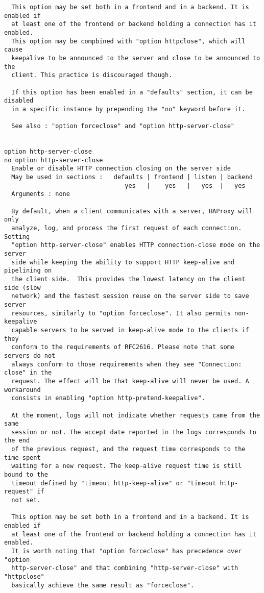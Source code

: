 \begin{verbatim}
  This option may be set both in a frontend and in a backend. It is enabled if
  at least one of the frontend or backend holding a connection has it enabled.
  This option may be compbined with "option httpclose", which will cause
  keepalive to be announced to the server and close to be announced to the
  client. This practice is discouraged though.

  If this option has been enabled in a "defaults" section, it can be disabled
  in a specific instance by prepending the "no" keyword before it.

  See also : "option forceclose" and "option http-server-close"


option http-server-close
no option http-server-close
  Enable or disable HTTP connection closing on the server side
  May be used in sections :   defaults | frontend | listen | backend
                                 yes   |    yes   |   yes  |   yes
  Arguments : none

  By default, when a client communicates with a server, HAProxy will only
  analyze, log, and process the first request of each connection. Setting
  "option http-server-close" enables HTTP connection-close mode on the server
  side while keeping the ability to support HTTP keep-alive and pipelining on
  the client side.  This provides the lowest latency on the client side (slow
  network) and the fastest session reuse on the server side to save server
  resources, similarly to "option forceclose". It also permits non-keepalive
  capable servers to be served in keep-alive mode to the clients if they
  conform to the requirements of RFC2616. Please note that some servers do not
  always conform to those requirements when they see "Connection: close" in the
  request. The effect will be that keep-alive will never be used. A workaround
  consists in enabling "option http-pretend-keepalive".

  At the moment, logs will not indicate whether requests came from the same
  session or not. The accept date reported in the logs corresponds to the end
  of the previous request, and the request time corresponds to the time spent
  waiting for a new request. The keep-alive request time is still bound to the
  timeout defined by "timeout http-keep-alive" or "timeout http-request" if
  not set.

  This option may be set both in a frontend and in a backend. It is enabled if
  at least one of the frontend or backend holding a connection has it enabled.
  It is worth noting that "option forceclose" has precedence over "option
  http-server-close" and that combining "http-server-close" with "httpclose"
  basically achieve the same result as "forceclose".


\end{verbatim}
